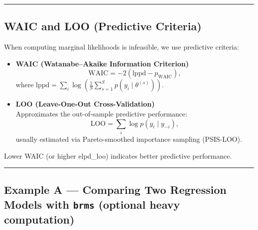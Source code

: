 \documentclass[
  letterpaper,
  DIV=11,
  numbers=noendperiod]{scrreprt}
\begin{document}
\begin{center}\rule{0.5\linewidth}{0.5pt}\end{center}

\subsection{WAIC and LOO (Predictive
Criteria)}\label{waic-and-loo-predictive-criteria}

When computing marginal likelihoods is infeasible, we use predictive
criteria:

\begin{itemize}
\item
  \textbf{WAIC (Watanabe--Akaike Information Criterion)}\\
  \[
  \text{WAIC} = -2(\text{lppd} - p_{\text{WAIC}}),
  \] where
  \(\text{lppd}=\sum_i \log\!\left(\frac{1}{S}\sum_{s=1}^S p(y_i\mid\theta^{(s)})\right)\).
\item
  \textbf{LOO (Leave-One-Out Cross-Validation)}\\
  Approximates the out-of-sample predictive performance: \[
  \text{LOO} = \sum_i \log p(y_i \mid y_{-i}),
  \] usually estimated via Pareto-smoothed importance sampling
  (PSIS-LOO).
\end{itemize}

Lower WAIC (or higher elpd\_loo) indicates better predictive
performance.

\begin{center}\rule{0.5\linewidth}{0.5pt}\end{center}

\subsection{\texorpdfstring{Example A --- Comparing Two Regression
Models with \texttt{brms} (optional heavy
computation)}{Example A --- Comparing Two Regression Models with brms (optional heavy computation)}}\label{example-a-comparing-two-regression-models-with-brms-optional-heavy-computation}
\end{document}
